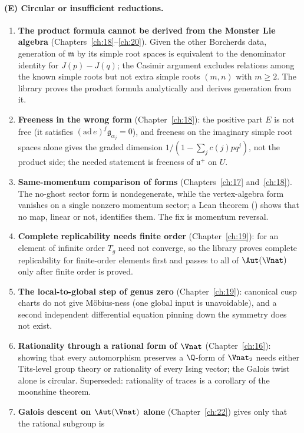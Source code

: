 \paragraph{(E) Circular or insufficient reductions.}
\begin{enumerate}
\item \textbf{The product formula cannot be derived from the Monster Lie algebra} (Chapters~\ref{ch:18}--\ref{ch:20}).
  Given the other Borcherds data, generation of $\mathfrak m$ by its simple root spaces is equivalent to the
  denominator identity for $J(p)-J(q)$; the Casimir argument excludes relations among the known simple roots but not
  extra simple roots $(m,n)$ with $m\ge2$. The library proves the product formula analytically and derives generation
  from it.
\item \textbf{Freeness in the wrong form} (Chapter~\ref{ch:18}): the positive part $E$ is not free (it satisfies
  $(\mathrm{ad}\,e)^j\mathfrak g_{\alpha_j}=0$), and freeness on the imaginary simple root spaces alone gives the graded
  dimension $1/(1-\sum_jc(j)pq^j)$, not the product side; the needed statement is freeness of $\mathfrak u^+$ on $U$.
\item \textbf{Same-momentum comparison of forms} (Chapters~\ref{ch:17} and~\ref{ch:18}). The no-ghost sector form is
  nondegenerate, while the vertex-algebra form vanishes on a single nonzero momentum sector; a Lean theorem
  () shows that no map, linear or not, identifies them. The fix is
  momentum reversal.
\item \textbf{Complete replicability needs finite order} (Chapter~\ref{ch:19}): for an element of infinite order $T_g$
  need not converge, so the library proves complete replicability for finite-order elements first and passes to all of
  $\Aut(\Vnat)$ only after finite order is proved.
\item \textbf{The local-to-global step of genus zero} (Chapter~\ref{ch:19}): canonical cusp charts do not give
  M\"obius-ness (one global input is unavoidable), and a second independent differential equation pinning down the
  symmetry does not exist.
\item \textbf{Rationality through a rational form of $\Vnat$} (Chapter~\ref{ch:16}): showing that every automorphism
  preserves a $\Q$-form of $\Vnat_2$ needs either Tits-level group theory or rationality of every Ising vector; the Galois
  twist alone is circular. Superseded: rationality of traces is a corollary of the moonshine theorem.
\item \textbf{Galois descent on $\Aut(\Vnat)$ alone} (Chapter~\ref{ch:22}) gives only that the rational subgroup is

\end{enumerate}
